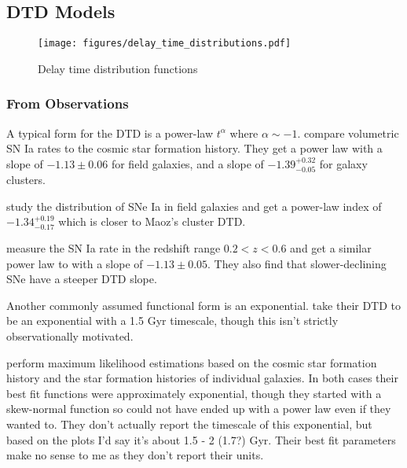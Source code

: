 \documentclass[twocolumn,linenumbers,twocolappendix]{aastex631}
\begin{document}
\subsection{DTD Models}
\label{sec:dtd-models}

\begin{figure}
    \centering
    \texttt{[image: figures/delay\_time\_distributions.pdf]}
    \caption{Delay time distribution functions}
    \label{fig:dtds}
\end{figure}

\subsubsection{From Observations}

\citet{Maoz2014-Review}

A typical form for the DTD is a power-law $t^\alpha$ where $\alpha\sim-1$. \citet{Maoz2017-CosmicDTD} compare volumetric SN Ia rates to the cosmic star formation history. They get a power law with a slope of $-1.13\pm 0.06$ for field galaxies, and a slope of $-1.39^{+0.32}_{-0.05}$ for galaxy clusters.

\citet{Heringer2019-FieldGalaxyDTD} study the distribution of SNe Ia in field galaxies and get a power-law index of $-1.34^{+0.19}_{-0.17}$ which is closer to Maoz's cluster DTD.

\citet{Wiseman2021-DESRates} measure the SN Ia rate in the redshift range $0.2 < z < 0.6$ and get a similar power law to \citet{Maoz2017-CosmicDTD} with a slope of $-1.13 \pm 0.05$. They also find that slower-declining SNe have a steeper DTD slope.

Another commonly assumed functional form is an exponential. \citet{Schonrich2009-RadialMixing} take their DTD to be an exponential with a 1.5 Gyr timescale, though this isn't strictly observationally motivated.

\citet{Stolger2020-ExponentialDTD} perform maximum likelihood estimations based on the cosmic star formation history and the star formation histories of individual galaxies. In both cases their best fit functions were approximately exponential, though they started with a skew-normal function so could not have ended up with a power law even if they wanted to. They don't actually report the timescale of this exponential, but based on the plots I'd say it's about 1.5 - 2 (1.7?) Gyr. Their best fit parameters make no sense to me as they don't report their units.

\end{document}
